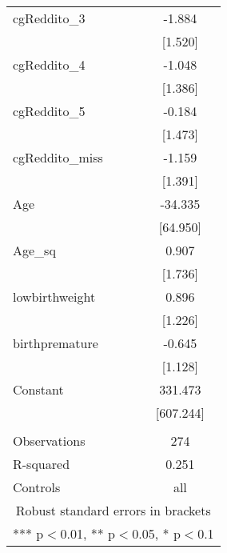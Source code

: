 \documentclass[]{article}
\begin{document}
\begin{tabular}{lc}
cgReddito\_3 & -1.884 \\
 & [1.520] \\
cgReddito\_4 & -1.048 \\
 & [1.386] \\
cgReddito\_5 & -0.184 \\
 & [1.473] \\
cgReddito\_miss & -1.159 \\
 & [1.391] \\
Age & -34.335 \\
 & [64.950] \\
Age\_sq & 0.907 \\
 & [1.736] \\
lowbirthweight & 0.896 \\
 & [1.226] \\
birthpremature & -0.645 \\
 & [1.128] \\
Constant & 331.473 \\
 & [607.244] \\
 &  \\
Observations & 274 \\
R-squared & 0.251 \\
 Controls & all \\ \hline
\multicolumn{2}{c}{ Robust standard errors in brackets} \\
\multicolumn{2}{c}{ *** p$<$0.01, ** p$<$0.05, * p$<$0.1} \\
\end{tabular}
\end{document}
